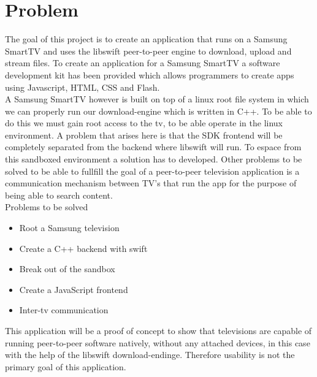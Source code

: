\chapter{Problem}
\label{sec:problems}
The goal of this project is to create an application that runs on a Samsung SmartTV and uses the libswift peer-to-peer engine to download, upload and stream files. To create an application for a Samsung SmartTV a software development kit has been provided which allows programmers to create apps using Javascript, HTML, CSS and Flash.\\
A Samsung SmartTV however is built on top of a linux root file system in which we can properly run our download-engine which is written in C++. To be able to do this we must gain root access to the tv, to be able operate in the linux environment. A problem that arises here is that the SDK frontend will be completely separated from the backend where libswift will run. To espace from this sandboxed environment a solution has to developed. Other problems to be solved to be able to fullfill the goal of a peer-to-peer television application is a communication mechanism between TV's that run the app for the purpose of being able to search content.\\

Problems to be solved
\begin{itemize}
\item Root a Samsung television
\item Create a C++ backend with swift
\item Break out of the sandbox
\item Create a JavaScript frontend
\item Inter-tv communication
\end{itemize}

This application will be a proof of concept to show that televisions are capable of running peer-to-peer software natively, without any attached
devices, in this case with the help of the libswift download-endinge. Therefore usability is not the primary goal of this application.
